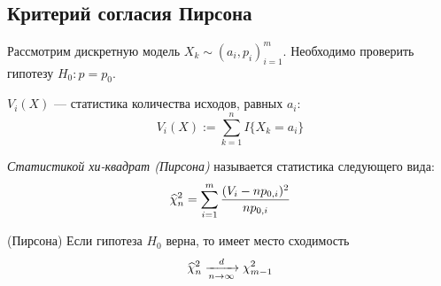 \subsection{Критерий согласия Пирсона}

\begin{problem}
	Рассмотрим дискретную модель $X_k \sim (a_i, p_i)_{i = 1}^m$. Необходимо проверить гипотезу $H_0 \colon p = p_0$.
\end{problem}

\begin{definition}
	$V_i(X)$ --- статистика количества исходов, равных $a_i$:
	\[
		V_i(X) := \sum_{k = 1}^n I\{X_k = a_i\}
	\]
\end{definition}

\begin{definition}
	\textit{Статистикой хи-квадрат (Пирсона)} называется статистика следующего вида:
	\[
		\widehat{\chi}_n^2 = \sum_{i = 1}^m \frac{(V_i - np_{0, i})^2}{np_{0, i}}
	\]
\end{definition}

\begin{theorem} (Пирсона)
	Если гипотеза $H_0$ верна, то имеет место сходимость
	\[
		\widehat{\chi}_n^2 \xrightarrow[n \to \infty]{d} \chi_{m - 1}^2
	\]
\end{theorem}




